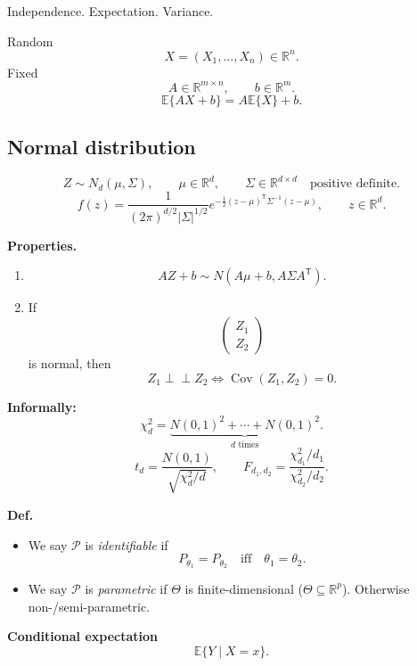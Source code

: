 \documentclass[11pt,a4paper]{article}
\begin{document}
\noindent
Independence. Expectation. Variance.

\medskip

\noindent
Random
\[
X=(X_1,\ldots,X_n)\in\mathbb{R}^n.
\]
Fixed
\[
A\in\mathbb{R}^{m\times n},
\qquad
b\in\mathbb{R}^m.
\]
\[
\mathbb{E}\{AX+b\}
=
A\mathbb{E}\{X\}+b.
\]

\subsection*{Normal distribution}

\[
Z\sim N_d(\mu,\Sigma),
\qquad
\mu\in\mathbb{R}^d,
\qquad
\Sigma\in\mathbb{R}^{d\times d}
\quad\text{positive definite}.
\]
\[
f(z)
=
\frac{1}{(2\pi)^{d/2}|\Sigma|^{1/2}}
e^{-\frac12(z-\mu)^{\mathsf T}\Sigma^{-1}(z-\mu)},
\qquad
z\in\mathbb{R}^d.
\]

\noindent\textbf{Properties.}
\begin{enumerate}
    \item
    \[
    AZ+b\sim N(A\mu+b,A\Sigma A^{\mathsf T}).
    \]

    \item If
    \[
    \begin{pmatrix}
        Z_1\\
        Z_2
    \end{pmatrix}
    \]
    is normal, then
    \[
    Z_1\perp\!\!\!\perp Z_2
    \iff
    \operatorname{Cov}(Z_1,Z_2)=0.
    \]
\end{enumerate}

\noindent\textbf{Informally:}
\[
\chi_d^2
=
\underbrace{
N(0,1)^2+\cdots+N(0,1)^2
}_{d\text{ times}}.
\]
\[
t_d
=
\frac{N(0,1)}{\sqrt{\chi_d^2/d}},
\qquad
F_{d_1,d_2}
=
\frac{\chi_{d_1}^2/d_1}{\chi_{d_2}^2/d_2}.
\]

\medskip

\noindent\textbf{Def.}
\begin{itemize}
    \item We say $\mathcal{P}$ is \emph{identifiable} if
    \[
    P_{\theta_1}=P_{\theta_2}
    \quad\text{iff}\quad
    \theta_1=\theta_2.
    \]

    \item We say $\mathcal{P}$ is \emph{parametric} if
    $\Theta$ is finite-dimensional
    ($\Theta\subseteq\mathbb{R}^p$).
    Otherwise non-/semi-parametric.
\end{itemize}

\medskip

\noindent\textbf{Conditional expectation}
\[
\mathbb{E}\{Y\mid X=x\}.
\]
\end{document}
